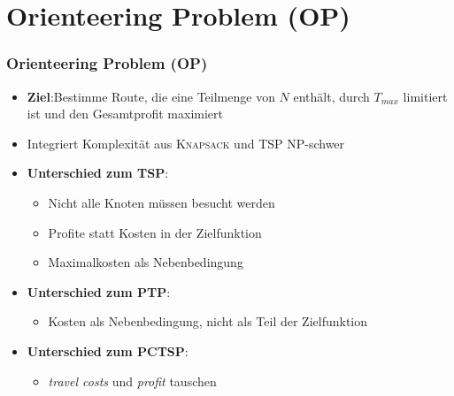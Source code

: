 \documentclass{beamer}
\begin{document}
\section{Orienteering Problem (\textsc{OP})}

\begin{frame}
\frametitle{Orienteering Problem (\textsc{OP})}
\begin{itemize}
  \item \textbf{Ziel}:\newline Bestimme Route, die eine Teilmenge von $N$ enthält, durch $T_{max}$ limitiert ist
  und den Gesamtprofit maximiert
  \item Integriert Komplexität aus \textsc{Knapsack} und \textsc{TSP} \textrightarrow NP-schwer
  \item \textbf{Unterschied zum \textsc{TSP}}:
  \begin{itemize}
    \item Nicht alle Knoten müssen besucht werden
    \item Profite statt Kosten in der Zielfunktion
    \item Maximalkosten als Nebenbedingung
  \end{itemize}
  \item \textbf{Unterschied zum \textsc{PTP}}:
  \begin{itemize}
    \item Kosten als Nebenbedingung, nicht als Teil der Zielfunktion
  \end{itemize}
  \item \textbf{Unterschied zum \textsc{PCTSP}}:
  \begin{itemize}
    \item \textit{travel costs} und \textit{profit} tauschen 
  \end{itemize}
\end{itemize}
\end{frame}
\end{document}
